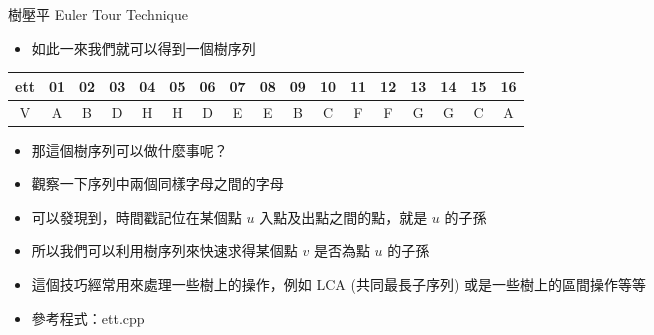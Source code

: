 \documentclass[aspectratio=169]{beamer}
\begin{document}
    \begin{frame}{樹壓平 Euler Tour Technique}
        \begin{itemize}
            \item 如此一來我們就可以得到一個樹序列
        \end{itemize}

        \begin{center}
            \begin{tabular}{c|c|c|c|c|c|c|c|c|c|c|c|c|c|c|c|c}
                ett & 01 & 02 & 03 & 04 & 05 & 06 & 07 & 08 & 09 & 10 & 11 & 12 & 13 & 14 & 15 & 16\\
                \hline
                V & A & B & D & H & H & D & E & E & B & C & F & F & G & G & C & A
            \end{tabular}
        \end{center}

        \begin{itemize}
            \item<1-> 那這個樹序列可以做什麼事呢？
            \item<2-> 觀察一下序列中兩個同樣字母之間的字母
            \item<3-> 可以發現到，時間戳記位在某個點 $u$ 入點及出點之間的點，就是 $u$ 的子孫
            \item<4-> 所以我們可以利用樹序列來快速求得某個點 $v$ 是否為點 $u$ 的子孫
            \item<5-> 這個技巧經常用來處理一些樹上的操作，例如 LCA (共同最長子序列) 或是一些樹上的區間操作等等
            \item<5-> 參考程式：ett.cpp
        \end{itemize}
    \end{frame}
\end{document}
